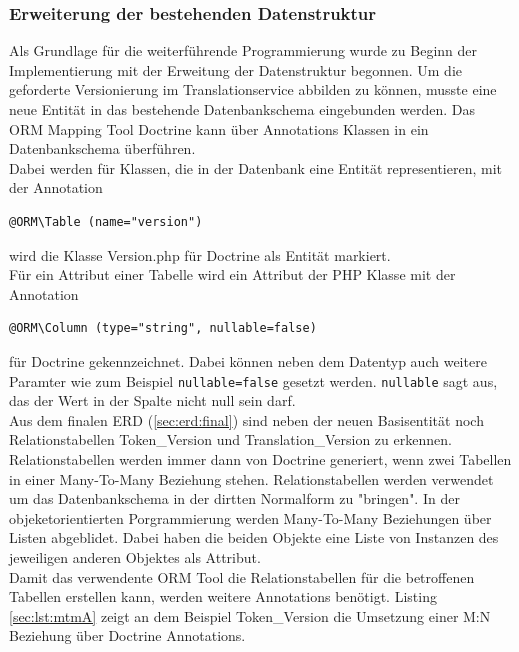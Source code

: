 \documentclass[10pt, oneside]{article}
\begin{document}
  \subsubsection{Erweiterung der bestehenden Datenstruktur}\label{sec:impl:db}
    Als Grundlage für die weiterführende Programmierung wurde zu Beginn der Implementierung mit der Erweitung der Datenstruktur begonnen. 
    Um die geforderte Versionierung im Translationservice abbilden zu können, musste eine neue Entität in das bestehende Datenbankschema eingebunden werden.
    Das ORM Mapping Tool Doctrine kann über Annotations Klassen in ein Datenbankschema überführen.\\
    Dabei werden für Klassen, die in der Datenbank eine Entität representieren, mit der Annotation
    \begin{lstlisting}[caption={Annotation für eine Entität},captionpos=b]
      @ORM\Table (name="version")
    \end{lstlisting}
    wird die Klasse Version.php für Doctrine als Entität markiert.\\
    Für ein Attribut einer Tabelle wird ein Attribut der PHP Klasse mit der Annotation 
    \begin{lstlisting}[caption={Annotation für ein Attribut},captionpos=b]
      @ORM\Column (type="string", nullable=false)
    \end{lstlisting} 
    für Doctrine gekennzeichnet. Dabei können neben dem Datentyp auch weitere Paramter wie zum Beispiel \lstinline{nullable=false} gesetzt werden. \lstinline{nullable} sagt aus, das der Wert in der Spalte 
    nicht null sein darf.\\
    Aus dem finalen ERD (\ref{sec:erd:final}) sind neben der neuen Basisentität noch Relationstabellen Token\_Version und Translation\_Version zu erkennen. Relationstabellen werden immer dann von Doctrine generiert, wenn
    zwei Tabellen in einer Many-To-Many Beziehung stehen. Relationstabellen werden verwendet um das Datenbankschema in der dirtten Normalform zu "bringen". In der objeketorientierten Porgrammierung werden Many-To-Many Beziehungen über Listen abgeblidet. Dabei haben die beiden
    Objekte eine Liste von Instanzen des jeweiligen anderen Objektes als Attribut.\\
    Damit das verwendente ORM Tool die Relationstabellen für die betroffenen Tabellen erstellen kann, werden weitere Annotations benötigt. Listing \ref{sec:lst:mtmA} zeigt an dem Beispiel Token\_Version die Umsetzung einer M:N Beziehung über Doctrine Annotations.
\end{document}
